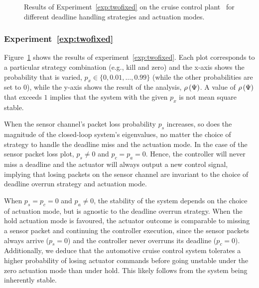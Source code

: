 \begin{figure}[t]
    \caption{Results of Experiment~\ref{exp:twofixed} on the cruise control plant~\cite{Ghosh:2018} for different deadline handling strategies and actuation modes.}
    \label{fig:samarjit-fix2}
\end{figure}

\subsubsection*{Experiment~\ref{exp:twofixed}}%
%
Figure~\ref{fig:samarjit-fix2} shows the results of experiment~\ref{exp:twofixed}.
Each plot corresponds to a particular strategy combination (e.g., kill and zero) and the x-axis shows the probability that is varied, $p_x \in \{0,0.01,\dots,0.99\}$ (while the other probabilities are set to $0$), while the y-axis shows the result of the analysis, $\rho\left( \Psi \right)$.
A value of $\rho\left( \Psi \right)$ that exceeds $1$ implies that the system with the given $p_x$ is not mean square stable.

When the sensor channel's packet loss probability $p_s$ increases, so does the magnitude of the closed-loop system's eigenvalues, no matter the choice of strategy to handle the deadline miss and the actuation mode.
In the case of the sensor packet loss plot, $p_s \neq 0$ and $p_c = p_a = 0$.
Hence, the controller will never miss a deadline and the actuator will always output a new control signal, implying that losing packets on the sensor channel are invariant to the choice of deadline overrun strategy and actuation mode.

When $p_s = p_c=0$ and $p_a \neq 0$, the stability of the system depends on the choice of actuation mode, but is agnostic to the deadline overrun strategy.
When the hold actuation mode is favoured, the actuator outcome is comparable to missing a sensor packet and continuing the controller execution, since the sensor packets always arrive ($p_s=0$) and the controller never overruns its deadline ($p_c=0$).
Additionally, we deduce that the automotive cruise control system tolerates a higher probability of losing actuator commands before going unstable under the zero actuation mode than under hold.
This likely follows from the system being inherently stable.

